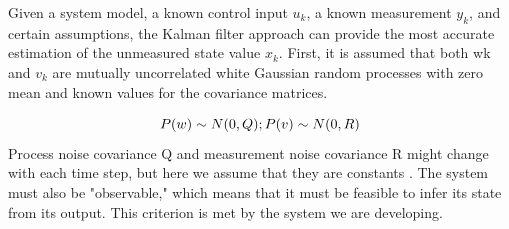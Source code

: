Given a system model, a known control input $u_k$, a known measurement $y_k$, and certain assumptions, the Kalman filter approach can provide the most accurate estimation of the unmeasured state value $x_k$.
First, it is assumed that both wk and $v_k$ are mutually uncorrelated white Gaussian random processes with zero mean and known values for the covariance matrices.

\begin{equation}\label{eq:Discrete_Noise_Covariance}
    P(w) \sim N(0,Q) ; \\
    P(v) \sim N(0,R) \\
\end{equation}
Process noise covariance Q and measurement noise covariance R might change with each time step, but here we assume that they are constants  \cite{SOC_Estimation_KalmanFilter_Ahmad}.
The system must also be "observable," which means that it must be feasible to infer its state from its output. This criterion is met by the system we are developing.

